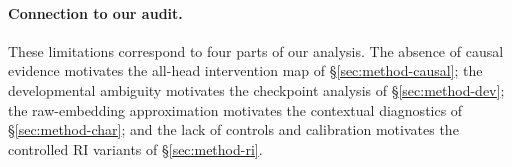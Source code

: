 \paragraph{Connection to our audit.}
These limitations correspond to four parts of our analysis. The absence of
causal evidence motivates the all-head intervention map of
\S\ref{sec:method-causal}; the developmental ambiguity motivates the
checkpoint analysis of \S\ref{sec:method-dev}; the raw-embedding approximation
motivates the contextual diagnostics of \S\ref{sec:method-char}; and the lack
of controls and calibration motivates the controlled RI variants of
\S\ref{sec:method-ri}.
